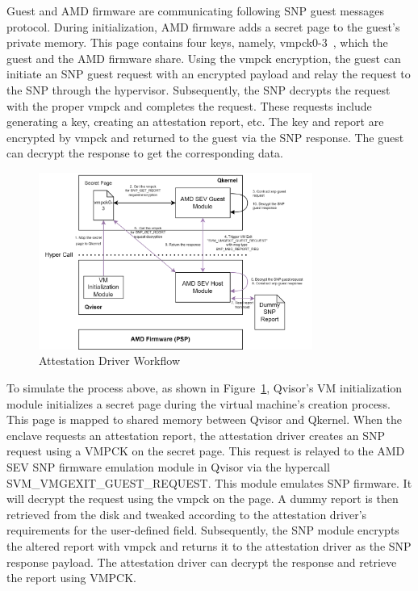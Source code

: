 Guest and AMD firmware are communicating following SNP guest messages protocol. During initialization, AMD firmware adds a secret page to the guest's private memory. This page contains four keys, namely, vmpck0-3~\cite*{snp_firmware}, which the guest and the AMD firmware share. Using the vmpck encryption,  the guest 
can initiate an SNP guest request with an encrypted payload and relay the request to the SNP through the hypervisor. Subsequently, the SNP decrypts the request with the proper vmpck and completes the request. These requests include generating a key, creating an attestation report, etc. The key and 
report are encrypted by vmpck and returned to the guest via the SNP response. The guest can decrypt the response to get the corresponding data.

\begin{figure}[htp]
    \centering
    \includegraphics[width=0.8\textwidth]{images/amd_snp_driver.png}
    \caption[Attestation Driver Workflow]{Attestation Driver Workflow}
    \label{fig:amd_snp_driver}
\end{figure}

To simulate the process above, as shown in Figure~\ref{fig:amd_snp_driver}, Qvisor's VM initialization module initializes a secret page during the virtual machine's creation process. This page is mapped to shared memory between Qvisor and Qkernel. When the enclave requests an attestation 
report, the attestation driver creates an  SNP request using a VMPCK on the secret page. This request is relayed to the AMD SEV SNP firmware emulation module in Qvisor via the hypercall SVM\_VMGEXIT\_GUEST\_REQUEST. This module emulates SNP firmware. It will decrypt the request 
using the vmpck on the page. A dummy report is then retrieved from the disk and tweaked according to the attestation driver's requirements for the user-defined field. Subsequently, the SNP module encrypts the altered report with vmpck and returns it to the attestation driver as the SNP response payload. The attestation driver can 
decrypt the response and retrieve the report using VMPCK.

